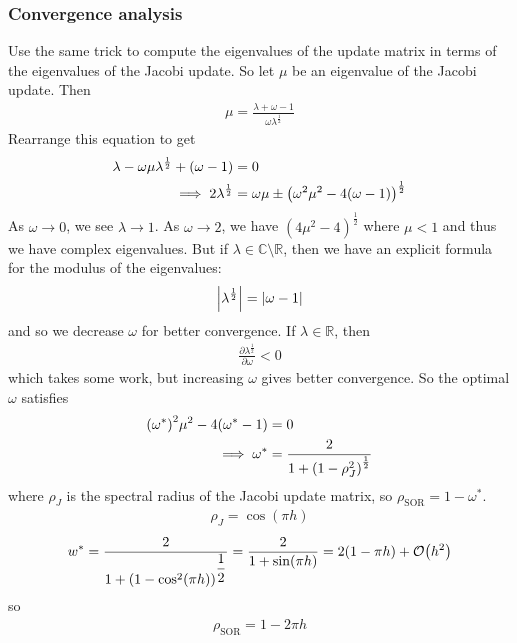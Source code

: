 \documentclass{article}
\newcommand{\Rl}{\mathbb{R}}
\newcommand{\Cx}{\mathbb{C}}
\begin{document}
            \subsubsection{Convergence analysis}
                Use the same trick to compute the eigenvalues of the update matrix in terms of the eigenvalues of the Jacobi update.  So let $\mu$ be an eigenvalue of the Jacobi update.  Then
                \begin{align*}
                    \mu = \frac{\lambda + \omega-1}{\omega\lambda^{\frac{1}{2}}}
                \end{align*}
                Rearrange this equation to get
                \begin{align*}
                    \lambda - \omega\mu\lambda^{\frac{1}{2}} + (\omega - 1) &= 0 \\
                    \implies 2\lambda^{\frac{1}{2}} &= \omega\mu \pm \qty(\omega^2\mu^2 - 4(\omega - 1))^{\frac{1}{2}}
                \end{align*}
                As $\omega \rightarrow 0$, we see $\lambda \rightarrow 1$.  As $\omega \rightarrow 2$, we have $(4\mu^2 - 4)^{\frac{1}{2}}$ where $\mu < 1$ and thus we have complex eigenvalues.  But if $\lambda \in \Cx\setminus\Rl$, then we have an explicit formula for the modulus of the eigenvalues:
                \begin{align*}
                    \abs{\lambda^{\frac{1}{2}}} = \abs{\omega - 1}
                \end{align*}
                and so we decrease $\omega$ for better convergence.  If $\lambda \in \Rl$, then
                \begin{align*}
                    \frac{\partial \lambda^{\frac{1}{2}}}{\partial \omega} < 0
                \end{align*}
                which takes some work, but increasing $\omega$ gives better convergence.  So the optimal $\omega$ satisfies
                \begin{align}
                    \qty(\omega^*)^2\mu^2 - 4\qty(\omega^* - 1) &= 0 \\
                    \implies \omega^* &= \frac{2}{1 + \qty(1 - \rho_J^2)^{\frac{1}{2}}}
                \end{align}
                where $\rho_J$ is the spectral radius of the Jacobi update matrix, so $\rho_\text{SOR} = 1 - \omega^*$.
                \begin{align}
                    \rho_J = \cos(\pi h)
                \end{align}
                \begin{align}
                    w^* = \frac{2}{1 + (1 - \cos^2(\pi h))^{\dfrac{1}{2}}} = \frac{2}{1 + \sin(\pi h)} = 2(1 - \pi h) + \order{h^2}
                \end{align}
                so
                \begin{align}
                    \rho_\text{SOR} = 1 - 2\pi h
                \end{align}
\end{document}

